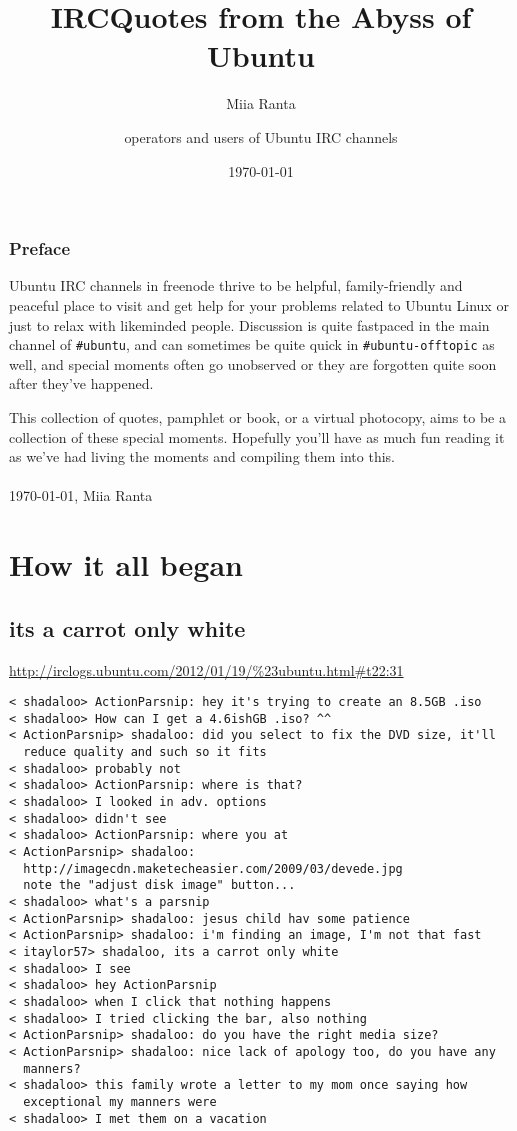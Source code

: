 \documentclass[a4paper]{book}
\title{IRCQuotes from the Abyss of Ubuntu}
\author{Miia Ranta \and operators and users of Ubuntu IRC channels}
\date{\today}
\begin{document}
\maketitle{}
\thispagestyle{empty}
\cleardoublepage{}

\pagestyle{headings}
\setcounter{page}{1}

\subsection*{Preface}

Ubuntu IRC channels in freenode thrive to be helpful, family-friendly 
and peaceful place to visit and get help for your problems related to 
Ubuntu Linux or just to relax with likeminded people. Discussion is quite 
fastpaced in the main channel of \verb$#ubuntu$, and can sometimes be quite 
quick in \verb$#ubuntu-offtopic$ as well, and special moments often go 
unobserved or they are forgotten quite soon after they've happened.

This collection of quotes, pamphlet or book, or a virtual photocopy, 
aims to be a collection of these special moments. Hopefully you'll 
have as much fun reading it as we've had living the moments and 
compiling them into this.
\\
\\
\today, Miia Ranta
\tableofcontents
\cleardoublepage

\setcounter{page}{1}
\chapter{How it all began}

\section*{its a carrot only white}
\url{http://irclogs.ubuntu.com/2012/01/19/%23ubuntu.html#t22:31}

\begin{verbatim}
< shadaloo> ActionParsnip: hey it's trying to create an 8.5GB .iso
< shadaloo> How can I get a 4.6ishGB .iso? ^^
< ActionParsnip> shadaloo: did you select to fix the DVD size, it'll 
  reduce quality and such so it fits
< shadaloo> probably not
< shadaloo> ActionParsnip: where is that?
< shadaloo> I looked in adv. options
< shadaloo> didn't see
< shadaloo> ActionParsnip: where you at
< ActionParsnip> shadaloo: 
  http://imagecdn.maketecheasier.com/2009/03/devede.jpg
  note the "adjust disk image" button...
< shadaloo> what's a parsnip
< ActionParsnip> shadaloo: jesus child hav some patience
< ActionParsnip> shadaloo: i'm finding an image, I'm not that fast
< itaylor57> shadaloo, its a carrot only white
< shadaloo> I see
< shadaloo> hey ActionParsnip
< shadaloo> when I click that nothing happens
< shadaloo> I tried clicking the bar, also nothing
< ActionParsnip> shadaloo: do you have the right media size?
< ActionParsnip> shadaloo: nice lack of apology too, do you have any 
  manners?
< shadaloo> this family wrote a letter to my mom once saying how 
  exceptional my manners were
< shadaloo> I met them on a vacation
\end{verbatim}
\end{document}

